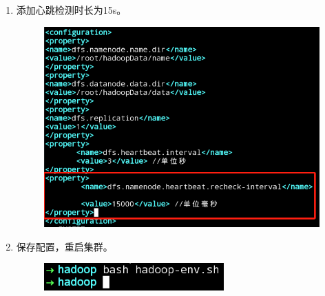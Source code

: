 \documentclass {article}
\begin{document}
\begin{enumerate}
					\item 添加心跳检测时长为15s。
					\begin{figure}[H]
						\centering
						\includegraphics[width=4.5in]{figures/fig3.png}
					\end{figure}
				
					\item 保存配置，重启集群。
					\begin{figure}[H]
						\centering
						\includegraphics{figures/fig4.png}
					\end{figure}
				\end{enumerate}
		
\end{document}
